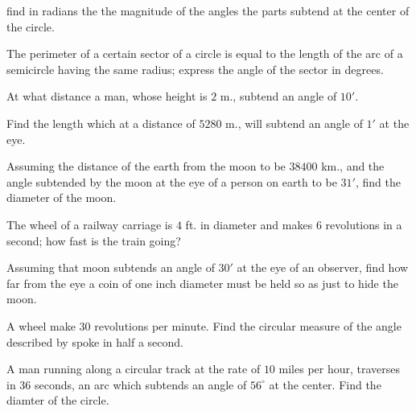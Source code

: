     find in radians the the magnitude of the angles the parts subtend at the center of the circle.
\item The perimeter of a certain sector of a circle is equal to the length of the arc of a semicircle having the same radius; express
    the angle of the sector in degrees.
\item At what distance a man, whose height is $2$ m., subtend an angle of $10'$.
\item Find the length which at a distance of $5280$ m., will subtend an angle of $1'$ at the eye.
\item Assuming the distance of the earth from the moon to be $38400$ km., and the angle subtended by the moon at the eye of a
    person on earth to be $31'$, find the diameter of the moon.
\item The wheel of a railway carriage is $4$ ft. in diameter and makes $6$ revolutions in a second; how fast is the train
    going?
\item Assuming that moon subtends an angle of $30'$ at the eye of an observer, find how far from the eye a coin of one inch
    diameter must be held so as just to hide the moon.
\item A wheel make $30$ revolutions per minute. Find the circular measure of the angle described by spoke in half a second.
\item A man running along a circular track at the rate of $10$ miles per hour, traverses in $36$ seconds, an arc which
    subtends an angle of $56^\circ$ at the center. Find the diamter of the circle.
\stopitemize
